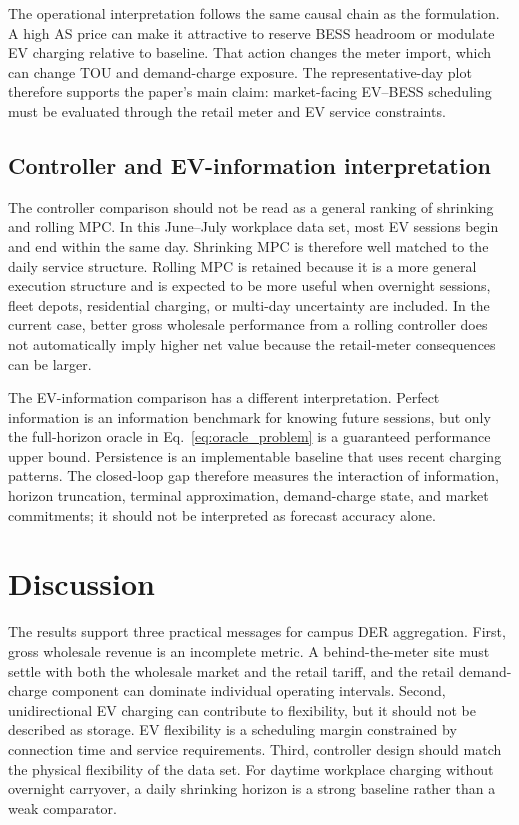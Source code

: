 \documentclass[final,5p,times]{elsarticle}
\begin{document}
The operational interpretation follows the same causal chain as the formulation. A high AS price can make it attractive to reserve BESS headroom or modulate EV charging relative to baseline. That action changes the meter import, which can change TOU and demand-charge exposure. The representative-day plot therefore supports the paper's main claim: market-facing EV--BESS scheduling must be evaluated through the retail meter and EV service constraints.

\subsection{Controller and EV-information interpretation}
The controller comparison should not be read as a general ranking of shrinking and rolling MPC. In this June--July workplace data set, most EV sessions begin and end within the same day. Shrinking MPC is therefore well matched to the daily service structure. Rolling MPC is retained because it is a more general execution structure and is expected to be more useful when overnight sessions, fleet depots, residential charging, or multi-day uncertainty are included. In the current case, better gross wholesale performance from a rolling controller does not automatically imply higher net value because the retail-meter consequences can be larger.

The EV-information comparison has a different interpretation. Perfect information is an information benchmark for knowing future sessions, but only the full-horizon oracle in Eq.~\eqref{eq:oracle_problem} is a guaranteed performance upper bound. Persistence is an implementable baseline that uses recent charging patterns. The closed-loop gap therefore measures the interaction of information, horizon truncation, terminal approximation, demand-charge state, and market commitments; it should not be interpreted as forecast accuracy alone.

\section{Discussion}
\label{sec:discussion}

The results support three practical messages for campus DER aggregation. First, gross wholesale revenue is an incomplete metric. A behind-the-meter site must settle with both the wholesale market and the retail tariff, and the retail demand-charge component can dominate individual operating intervals. Second, unidirectional EV charging can contribute to flexibility, but it should not be described as storage. EV flexibility is a scheduling margin constrained by connection time and service requirements. Third, controller design should match the physical flexibility of the data set. For daytime workplace charging without overnight carryover, a daily shrinking horizon is a strong baseline rather than a weak comparator.
\end{document}
